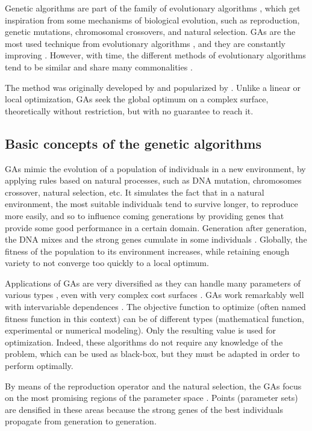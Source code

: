 \documentclass[twocol]{ametsoc}
\begin{document}
Genetic algorithms are part of the family of evolutionary algorithms \citep{Back1993b, Schwefel1993}, which get inspiration from some mechanisms of biological evolution, such as reproduction, genetic mutations, chromosomal crossovers, and natural selection. GAs are the most used technique from evolutionary algorithms \citep{Back1993b}, and they are constantly improving \citep{Haupt2004}. However, with time, the different methods of evolutionary algorithms tend to be similar and share many commonalities \citep{Back1996b, Haupt2004}.

The method was originally developed by \citet{Holland1992b} and popularized by \citet{Goldberg1989}. Unlike a linear or local optimization, GAs seek the global optimum on a complex surface, theoretically without restriction, but with no guarantee to reach it.


\subsection{Basic concepts of the genetic algorithms}

GAs mimic the evolution of a population of individuals in a new environment, by applying rules based on natural processes, such as DNA mutation, chromosomes crossover, natural selection, etc. It simulates the fact that in a natural environment, the most suitable individuals tend to survive longer, to reproduce more easily, and so to influence coming generations by providing genes that provide some good performance in a certain domain. Generation after generation, the DNA mixes and the strong genes cumulate in some individuals \citep{Beasley1996a}. Globally, the fitness of the population to its environment increases, while retaining enough variety to not converge too quickly to a local optimum.

Applications of GAs are very diversified as they can handle many parameters of various types \citep{Joines1996a}, even with very complex cost surfaces \citep{Haupt2004}. GAs work remarkably well with intervariable dependences \citep{Haupt2004}. The objective function to optimize (often named fitness function in this context) can be of different types (mathematical function, experimental or numerical modeling). Only the resulting value is used for optimization. Indeed, these algorithms do not require any knowledge of the problem, which can be used as black-box, but they must be adapted in order to perform optimally.

By means of the reproduction operator and the natural selection, the GAs focus on the most promising regions of the parameter space \citep{Holland1992b}. Points (parameter sets) are densified in these areas because the strong genes of the best individuals propagate from generation to generation.
\end{document}
